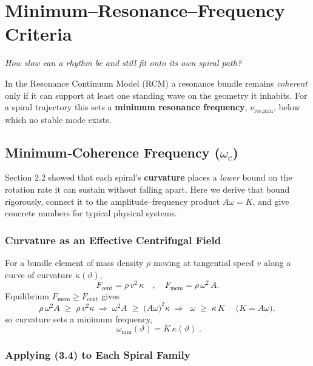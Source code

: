 \section{Minimum–Resonance–Frequency Criteria}
\label{sec:min-res-freq}

\noindent
\emph{How slow can a rhythm be and still fit onto its own spiral path?}

\smallskip
In the Resonance Continuum Model (RCM) a resonance bundle remains \emph{coherent}
only if it can support at least one standing wave on the geometry it inhabits.
For a spiral trajectory this sets a \textbf{minimum resonance frequency},
$\nu_{\text{res,min}}$, below which no stable mode exists.

\subsection{Minimum‐Coherence Frequency (\(\omega_c\))}

Section 2.2 showed that each spiral’s \textbf{curvature} places a \emph{lower} bound on the rotation rate it can sustain without falling apart.  Here we derive that bound rigorously, connect it to the amplitude–frequency product \(A\omega=K\), and give concrete numbers for typical physical systems.

\medskip
\subsubsection{Curvature as an Effective Centrifugal Field}

For a bundle element of mass density \(\rho\) moving at tangential speed \(v\) along a curve of curvature \(\kappa(\vartheta)\),
\[
  F_{\mathrm{cent}} = \rho\,v^{2}\,\kappa
  \quad,\quad
  F_{\mathrm{mem}} = \rho\,\omega^{2}\,A.
\]
Equilibrium \(F_{\mathrm{mem}}\ge F_{\mathrm{cent}}\) gives
\[
  \rho\,\omega^{2}A \;\ge\; \rho\,v^{2}\kappa
  \;\Longrightarrow\;
  \omega^{2}A \;\ge\;\bigl(A\omega\bigr)^{2}\kappa
  \;\Longrightarrow\;
  \boxed{\;\omega \;\ge\;\kappa\,K\;}\quad\bigl(K=A\omega\bigr),
  \tag{3.3}
\]
so curvature sets a minimum frequency,
\[
  \boxed{\;\omega_{\min}(\vartheta) = K\,\kappa(\vartheta)\;}.
  \tag{3.4}
\]

\medskip
\subsubsection{Applying (3.4) to Each Spiral Family}

